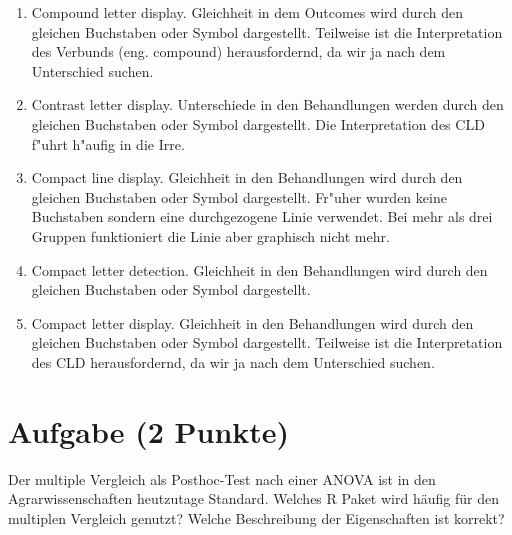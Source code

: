 \documentclass[a4paper, 9pt]{scrartcl}\usepackage[]{graphicx}\usepackage[]{xcolor}
\begin{document}
\begin{enumerate}
\item [\textbf{A} \msquare] Compound letter display. Gleichheit in dem Outcomes wird durch den gleichen Buchstaben oder Symbol dargestellt. Teilweise ist die Interpretation des Verbunds (eng. compound) herausfordernd, da wir ja nach dem Unterschied suchen.
\item [\textbf{B} \msquare] Contrast letter display. Unterschiede in den Behandlungen werden durch den gleichen Buchstaben oder Symbol dargestellt. Die Interpretation des CLD f{"u}hrt h{"a}ufig in die Irre.
\item [\textbf{C} \msquare] Compact line display. Gleichheit in den Behandlungen wird durch den gleichen Buchstaben oder Symbol dargestellt. Fr{"u}her wurden keine Buchstaben sondern eine durchgezogene Linie verwendet. Bei mehr als drei Gruppen funktioniert die Linie aber graphisch nicht mehr.
\item [\textbf{D} \msquare] Compact letter detection. Gleichheit in den Behandlungen wird durch den gleichen Buchstaben oder Symbol dargestellt.
\item [\textbf{E} \msquare] Compact letter display. Gleichheit in den Behandlungen wird durch den gleichen Buchstaben oder Symbol dargestellt. Teilweise ist die Interpretation des CLD herausfordernd, da wir ja nach dem Unterschied suchen.
\end{enumerate}

\section{Aufgabe \hfill (2 Punkte)}

Der multiple Vergleich als Posthoc-Test nach einer ANOVA ist in den
Agrarwissenschaften heutzutage Standard. Welches R Paket wird h{\"a}ufig f{\"u}r
den multiplen Vergleich genutzt? Welche Beschreibung der Eigenschaften ist korrekt?
\end{document}
